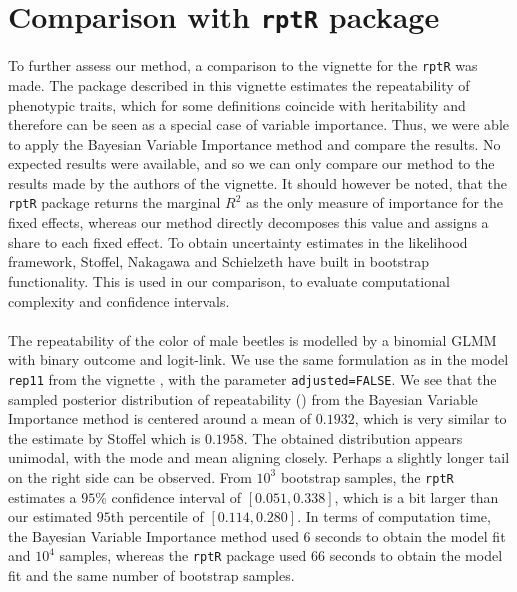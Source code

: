 \section{Comparison with \texttt{rptR} package}
To further assess our method, a comparison to the vignette for the \texttt{rptR} was made. The package described in this vignette estimates the repeatability of phenotypic traits, which for some definitions coincide with heritability and therefore can be seen as a special case of variable importance. Thus, we were able to apply the Bayesian Variable Importance method and compare the results. No expected results were available, and so we can only compare our method to the results made by the authors of the vignette. It should however be noted, that the \texttt{rptR} package returns the marginal $R^2$ as the only measure of importance for the fixed effects, whereas our method directly decomposes this value and assigns a share to each fixed effect. To obtain uncertainty estimates in the likelihood framework, Stoffel, Nakagawa and Schielzeth have built in bootstrap functionality. This is used in our comparison, to evaluate computational complexity and confidence intervals.
\\
\\
The repeatability of the color of male beetles is modelled by a binomial GLMM with binary outcome and logit-link. We use the same formulation as in the model \texttt{rep11} from the vignette \citep{Stoffel2017rptR}, with the parameter \texttt{adjusted=FALSE}. We see that the sampled posterior distribution of repeatability () from the Bayesian Variable Importance method is centered around a mean of $0.1932$, which is very similar to the estimate by Stoffel which is $0.1958$. The obtained distribution appears unimodal, with the mode and mean aligning closely. Perhaps a slightly longer tail on the right side can be observed. From $10^3$ bootstrap samples, the \texttt{rptR} estimates a $95\%$ confidence interval of $[0.051, 0.338]$, which is a bit larger than our estimated $95$th percentile of $[0.114, 0.280]$. In terms of computation time, the Bayesian Variable Importance method used $6$ seconds to obtain the model fit and $10^4$ samples, whereas the \texttt{rptR} package used $66$ seconds to obtain the model fit and the same number of bootstrap samples.
